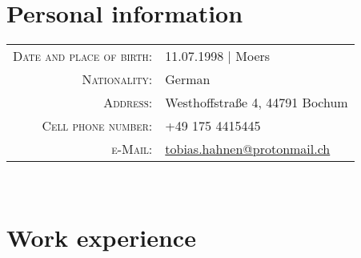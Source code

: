 \documentclass[10pt,a4paper]{article}
\begin{document}
%
%
\par{
	\bigskip\par
}


%
%
%
\section{Personal information}

\begin{tabular}{rl}
    \textsc{Date and place of birth:}	& 11.07.1998 | Moers \\
    \textsc{Nationality:}			& German \\
    \textsc{Address:}				& Westhoffstraße 4, 44791 Bochum \\
    \textsc{Cell phone number:}		& +49 175 4415445 \\
    \textsc{e-Mail:}				& \href{mailto:tobias.hahnen@protonmail.ch}{tobias.hahnen@protonmail.ch}
\end{tabular} \\


\section{Work experience}
\end{document}
